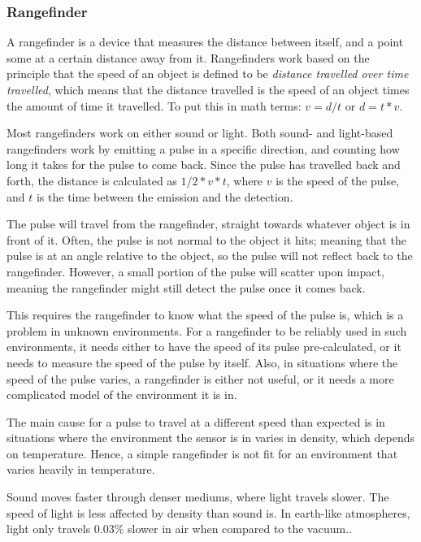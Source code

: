 \subsubsection{Rangefinder}%
A rangefinder is a device that measures the distance between itself, and a point some at a certain distance away from it. Rangefinders work based on the principle that the speed of an object is defined to be \textit{distance travelled over time travelled}, which means that the distance travelled is the speed of an object times the amount of time it travelled. To put this in math terms: \(v=d/t\) or \(d=t*v\).

Most rangefinders work on either sound or light. Both sound- and light-based rangefinders work by emitting a pulse in a specific direction, and counting how long it takes for the pulse to come back. Since the pulse has travelled back and forth, the distance is calculated as \(1/2*v*t\), where \(v\) is the speed of the pulse, and \(t\) is the time between the emission and the detection.

The pulse will travel from the rangefinder, straight towards whatever object is in front of it. Often, the pulse is not normal to the object it hits; meaning that the pulse is at an angle relative to the object, so the pulse will not reflect back to the rangefinder. However, a small portion of the pulse will scatter upon impact, meaning the rangefinder might still detect the pulse once it comes back.

This requires the rangefinder to know what the speed of the pulse is, which is a problem in unknown environments. For a rangefinder to be reliably used in such environments, it needs either to have the speed of its pulse pre-calculated, or it needs to measure the speed of the pulse by itself. Also, in situations where the speed of the pulse varies, a rangefinder is either not useful, or it needs a more complicated model of the environment it is in.

The main cause for a pulse to travel at a different speed than expected is in situations where the environment the sensor is in varies in density, which depends on temperature\cite{refraction}. Hence, a simple rangefinder is not fit for an environment that varies heavily in temperature.

Sound moves faster through denser mediums, where light travels slower. The speed of light is less affected by density than sound is. In earth-like atmospheres, light only travels 0.03\% slower in air when compared to the vacuum.\cite{refraction}\cite{speedOfSound}.

